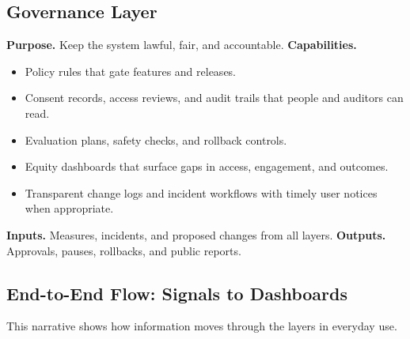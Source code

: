 \documentclass[12pt]{article}
\begin{document}
\subsection*{Governance Layer}
\textbf{Purpose.} Keep the system lawful, fair, and accountable.  
\textbf{Capabilities.}
\begin{itemize}[leftmargin=*]
  \item Policy rules that gate features and releases.
  \item Consent records, access reviews, and audit trails that people and auditors can read.
  \item Evaluation plans, safety checks, and rollback controls.
  \item Equity dashboards that surface gaps in access, engagement, and outcomes.
  \item Transparent change logs and incident workflows with timely user notices when appropriate.
\end{itemize}
\textbf{Inputs.} Measures, incidents, and proposed changes from all layers.  
\textbf{Outputs.} Approvals, pauses, rollbacks, and public reports.

\subsection*{End-to-End Flow: Signals to Dashboards}
This narrative shows how information moves through the layers in everyday use.
\end{document}
